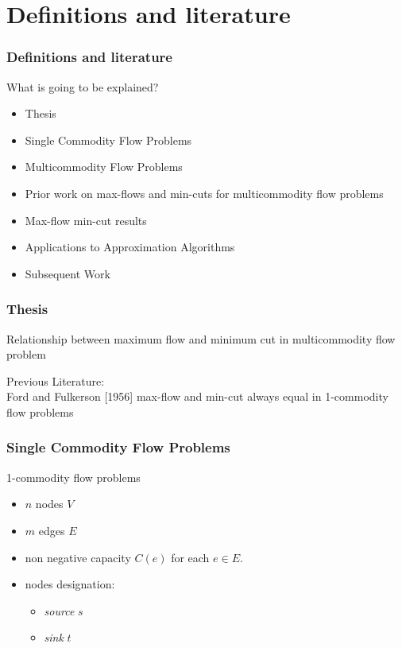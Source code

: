 
\setlength{\parskip}{\baselineskip} 
\section{Definitions and literature}
\begin{frame}[t]
\frametitle{Definitions and literature}
\begin{block}{What is going to be explained?}
	\begin{itemize}
		\item Thesis
		\item Single Commodity Flow Problems
		\item Multicommodity Flow Problems
		\item Prior work on max-flows and min-cuts for multicommodity flow problems
		\item Max-flow min-cut results
		\item Applications to Approximation Algorithms
		\item Subsequent Work
	 \end{itemize} 
\end{block}
\end{frame}

\begin{frame}
\frametitle{Thesis}
Relationship between maximum flow and minimum cut in multicommodity flow problem

Previous Literature:\\
Ford and Fulkerson [1956]
max-flow and min-cut always equal in 1-commodity flow problems
\end{frame}


\begin{frame}
\frametitle{Single Commodity Flow Problems}
1-commodity flow problems
\begin{itemize}
	\item $n$ nodes $V$
	\item $m$ edges $E$
	\item non negative capacity $C(e)$ for each $e \in E$. 
	\item nodes designation: 
	\begin{itemize}
		\item \textit{source} $s$
		\item \textit{sink} $t$
	\end{itemize}
\end{itemize}
\end{frame}


